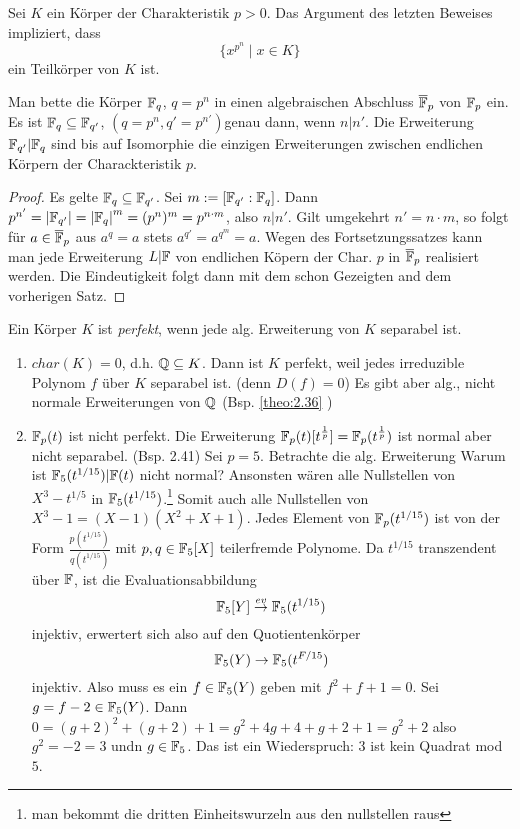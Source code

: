 \documentclass[../main.tex]{subfiles}
\begin{document}
\begin{remark}
    Sei $K$ ein Körper der Charakteristik $p>0$.
    Das Argument des letzten Beweises impliziert, dass $$\{x^{p^n}\mid x\in K\}$$ ein Teilkörper von $K$ ist.
\end{remark}
\begin{corollary}
    Man bette die Körper $\mathbb{F}_q$, $ q=p^n$ in einen algebraischen Abschluss $\overline{\mathbb{F}}_p$ von $\mathbb{F}_p$ ein.
    Es ist $\mathbb{F}_q \subseteq \mathbb{F}_{q'}$, $(q = p^n, q'=p^{n'})$genau dann, wenn $n|n'$.
    Die Erweiterung $\mathbb{F}_{q'}|\mathbb{F}_q$ sind bis auf Isomorphie die einzigen Erweiterungen zwischen endlichen Körpern der Charackteristik $p$.
\end{corollary}
\begin{proof}
    Es gelte $\mathbb{F}_q \subseteq \mathbb{F}_{q'}$. Sei $m:= [\mathbb{F}_{q'}:\mathbb{F}_q]$. Dann $p^{n'} = \left\vert  \mathbb{F}_{q'} \right\vert = \left\vert \mathbb{F}_q \right\vert^m = (p^n)^m = p^{n\cdot m}$, also $n|n'$.
    Gilt umgekehrt $n'=n\cdot m$, so folgt für $a\in \overline{\mathbb{F}}_p$ aus $a^q=a$ stets $a^{q'}=a^{q^m} = a$.
    Wegen des Fortsetzungssatzes kann man jede Erweiterung $L|\mathbb{F}$ von endlichen Köpern der Char. $p$ in $\overline{\mathbb{F}}_p$ realisiert werden.
    Die Eindeutigkeit folgt dann mit dem schon Gezeigten and  dem vorherigen Satz.
\end{proof}
Ein Körper $K$ ist \emph{perfekt}, wenn jede alg. Erweiterung von $K$ separabel ist.
\begin{enumerate} %
    \item $char(K)=0$, d.h. $\mathbb{Q} \subseteq K$. Dann ist $K$ perfekt, weil jedes irreduzible Polynom $f$ über $K$ separabel ist. (denn $D(f) = 0$) Es gibt aber alg., nicht normale Erweiterungen von $\mathbb{Q}$ (Bsp. \cref{theo:2.36} )
    \item $\mathbb{F}_p(t)$ ist nicht perfekt. Die Erweiterung $\mathbb{F}_p(t)[t^{\frac{1}{p}}] = \mathbb{F}_p(t^{\frac{1}{p}})$ ist normal aber nicht separabel. (Bsp. 2.41)
    Sei $p=5$. Betrachte die alg. Erweiterung
    \TODO[bild]
    Warum ist $\mathbb{F}_5(t^{1/15})|\mathbb{F}(t)$ nicht normal?
    Ansonsten wären alle Nullstellen von $X^3-t^{1/5}$ in $\mathbb{F}_5(t^{1/15})$.\footnote{man bekommt die dritten Einheitswurzeln aus den nullstellen raus}
    Somit auch alle Nullstellen von $X^3-1= (X-1)(X^2+X+1)$.
    Jedes Element von $\mathbb{F}_p(t^{1/15})$ ist von der Form $\frac{p(t^{1/15})}{q(t^{1/15})}$ mit $p,q \in \mathbb{F}_5[X]$ teilerfremde Polynome.
    Da $t^{1/15}$ transzendent über $\mathbb{F}$, ist die Evaluationsabbildung $$\mathbb{F}_5[Y]\overset{ev}{\rightarrow} \mathbb{F}_5(t^{1/15})$$ injektiv, erwertert sich also auf den Quotientenkörper $$\mathbb{F}_5(Y)\rightarrow \mathbb{F}_5(t^{F/15})$$ injektiv.
    Also muss es ein $f\in \mathbb{F}_5(Y)$ geben mit $f^2+f+1=0$.
    Sei $g=f-2\in \mathbb{F}_5(Y)$.
    Dann $0=(g+2)^2+(g+2)+1 = g^2 +4g+4+g+2+1= g^2 +2$ also $g^2=-2=3$ undn $g\in \mathbb{F}_5$.
    Das ist ein Wiederspruch: $3$ ist kein Quadrat mod $5$.
\end{enumerate}
\end{document}
